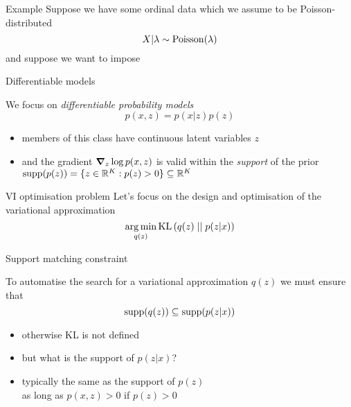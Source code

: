 \documentclass[14pt]{beamer}
\begin{document}
\begin{frame}{Example}
	Suppose we have some ordinal data which we assume to be Poisson-distributed
	\begin{equation*}
		X|\lambda \sim \operatorname{Poisson}(\lambda)
	\end{equation*}
	and suppose we want to impose 
\end{frame}

\begin{frame}{Differentiable models}

	We focus on \emph{differentiable probability models}
	\begin{equation*}
		p(x,z) = p(x|z)p(z)
	\end{equation*}
	\pause
	\begin{itemize}
		\item members of this class have continuous latent variables $z$\\ \pause
		\item and the gradient $\grad_z \log p(x,z)$ is valid within the \emph{support} of the prior 
		$\operatorname{supp}(p(z)) = \{ z \in \mathbb R^K : p(z) > 0 \} \subseteq \mathbb R^K$
	\end{itemize}
	
\end{frame}

\begin{frame}{VI optimisation problem}
	Let's focus on the design and optimisation of the variational approximation
	\begin{equation*}
		\operatorname*{arg\,min}_{q(z)} \operatorname{KL}\left(q(z)\mid\mid p(z|x)\right)
	\end{equation*}

	\pause
		
	 
\end{frame}

\begin{frame}{Support matching constraint}

	To automatise the search for a variational approximation $q(z)$ we must ensure that\\
	 \begin{equation*}
	 	\operatorname{supp}(q(z)) \subseteq \operatorname{supp}(p(z|x))
	\end{equation*}
	 \begin{itemize}
	 	\item otherwise KL is not defined \pause
		\item but what is the support of $p(z|x)$? \pause
		\item typically the same as the support of $p(z)$\\
		as long as $p(x,z) > 0$ if $p(z) > 0$		
	 \end{itemize}
	 
\end{frame}
\end{document}
